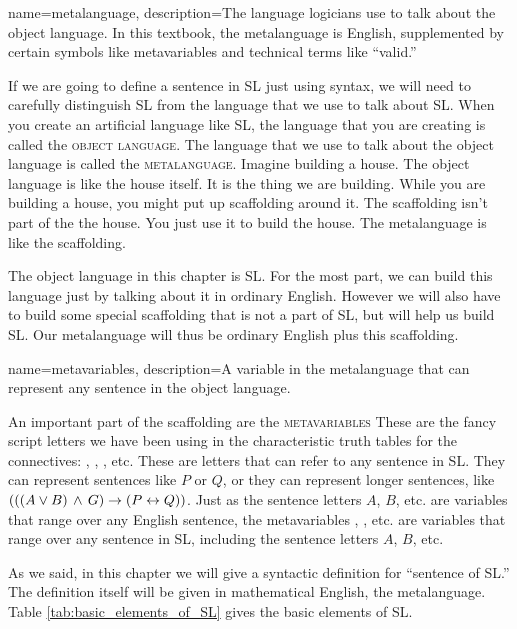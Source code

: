 {
name=metalanguage,
description={The language logicians use to talk about the object language. In this textbook, the metalanguage is English, supplemented by certain symbols like metavariables and technical terms like ``valid.''}
}

If we are going to define a sentence in SL just using syntax, we will need to carefully distinguish SL from the language that we use to talk about SL. When you create an artificial language like SL, the language that you are creating is called the \textsc{\gls{object language}}. \label{def:object_language} The language that we use to talk about the object language is called the \textsc{\gls{metalanguage}}. \label{def:metalanguage} Imagine building a house. The object language is like the house itself. It is the thing we are building. While you are building a house, you might put up scaffolding around it. The scaffolding isn't part of the the house. You just use it to build the house. The metalanguage is like the scaffolding.

The object language in this chapter is SL. For the most part, we can build this language just by talking about it in ordinary English. However we will also have to build some special scaffolding that is not a part of SL, but will help us build SL. Our metalanguage will thus be ordinary English plus this scaffolding.

{
name=metavariables,
description={A variable in the metalanguage that can represent any sentence in the object language.}
}



An important part of the scaffolding are the \textsc{\gls{metavariables}} \label{def:metavariables} These are the fancy script letters we have been using in the characteristic truth tables for the connectives: , , , etc. These are letters that can refer to any sentence in SL. They can represent sentences like $P$ or $Q$, or they can represent longer sentences, like $(((A \lor B) \,\land\, G) \rightarrow (P \leftrightarrow Q))$. Just as the sentence letters $A$, $B$, etc. are variables that range over any English sentence, the metavariables , , etc. are variables that range over any sentence in SL, including the sentence letters $A$, $B$, etc.

As we said, in this chapter we will give a syntactic definition for ``sentence of SL.'' The definition itself will be given in mathematical English, the metalanguage. Table \ref{tab:basic_elements_of_SL} gives the basic elements of SL.


